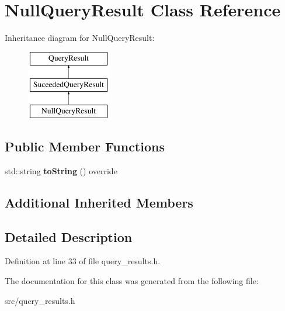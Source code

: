 \hypertarget{class_null_query_result}{}\section{Null\+Query\+Result Class Reference}
\label{class_null_query_result}
Inheritance diagram for Null\+Query\+Result\+:\begin{figure}[H]
\begin{center}
\leavevmode
\includegraphics[height=3.000000cm]{class_null_query_result}
\end{center}
\end{figure}
\subsection*{Public Member Functions}
\begin{DoxyCompactItemize}
\item 
\mbox{\label{class_null_query_result_ac51149e3f91cc4bc40c05796be2b5815}} 
std\+::string {\bfseries to\+String} () override
\end{DoxyCompactItemize}
\subsection*{Additional Inherited Members}


\subsection{Detailed Description}


Definition at line 33 of file query\+\_\+results.\+h.



The documentation for this class was generated from the following file\+:\begin{DoxyCompactItemize}
\item 
src/query\+\_\+results.\+h\end{DoxyCompactItemize}
